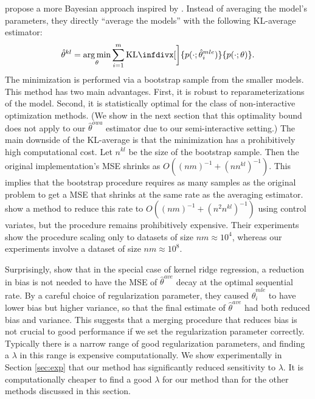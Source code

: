 \documentclass[twoside]{article}
\DeclareMathOperator*{\argmin}{arg\,min}
\newcommand{\w}{\theta}
\newcommand{\wkl}{\hat\w^{kl}}
\newcommand{\wowa}{\hat\w^{owa}}
\newcommand{\wave}{\hat\w^{ave}}
\newcommand{\wmle}{\hat\w^{mle}}
\newcommand{\kl}{\text{KL}\infdivx}
\begin{document}
\cite{liu2014distributed} propose a more Bayesian approach inspired by \cite{merugu2003privacy}.
Instead of averaging the model's parameters,
they directly ``average the models'' with the following KL-average estimator:
\begin{equation}
\wkl = \argmin_\w \sum_{i=1}^m \kl[\bigg]{p(\cdot;\wmle_i)}{p(\cdot;\w)}
.
\end{equation}
The minimization is performed via a bootstrap sample from the smaller models.
This method has two main advantages.
First, it is robust to reparameterizations of the model.
Second, it is statistically optimal for the class of non-interactive optimization methods.
(We show in the next section that this optimality bound does not apply to our $\wowa$ estimator due to our semi-interactive setting.)
The main downside of the KL-average is that the minimization has a prohibitively high computational cost.
Let $n^{kl}$ be the size of the bootstrap sample.
Then the original implementation's MSE shrinks as $O((nm)^{-1}+(nn^{kl})^{-1})$.
This implies that the bootstrap procedure requires as many samples as the original problem to get a MSE that shrinks at the same rate as the averaging estimator.
\cite{han2016bootstrap} show a method to reduce this rate to $O((nm)^{-1}+(n^2n^{kl})^{-1})$ using control variates, but the procedure remains prohibitively expensive.
Their experiments show the procedure scaling only to datasets of size $nm\approx10^4$,
whereas our experiments involve a dataset of size $nm\approx10^8$.

Surprisingly, \cite{zhang2013divide} show that in the special case of kernel ridge regression,
a reduction in bias is not needed to have the MSE of $\wave$ decay at the optimal sequential rate.
By a careful choice of regularization parameter,
they caused $\wmle_i$ to have lower bias but higher variance,
so that the final estimate of $\wave$ had both reduced bias and variance.
This suggests that a merging procedure that reduces bias is not crucial to good performance if we set the regularization parameter correctly.
Typically there is a narrow range of good regularization parameters,
and finding a $\lambda$ in this range is expensive computationally.
We show experimentally in Section \ref{sec:exp} that our method has significantly reduced sensitivity to $\lambda$.
It is computationally cheaper to find a good $\lambda$ for our method than for the other methods discussed in this section.
\end{document}
